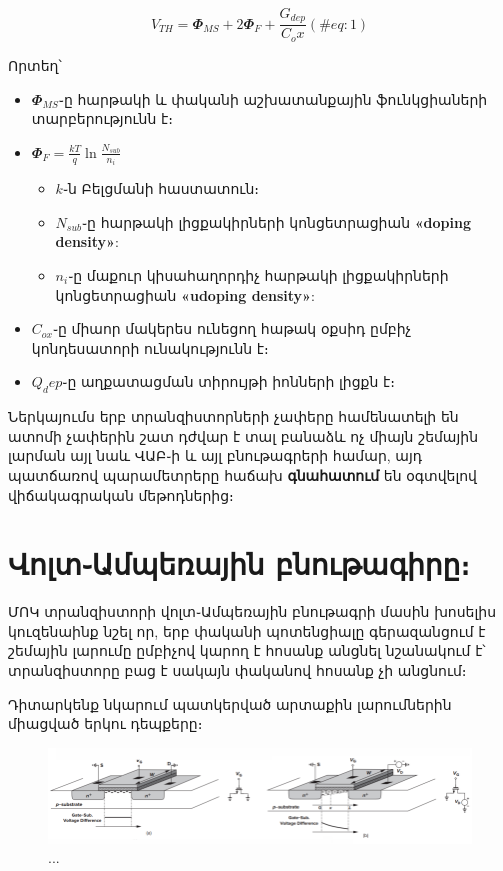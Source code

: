 \documentclass[
]{book}
\providecommand{\tightlist}{%
  \setlength{\itemsep}{0pt}\setlength{\parskip}{0pt}}
\begin{document}
\begin{equation} 
  V_{TH} = 𝜱_{MS} + 2 𝜱_F + \frac{G_{dep}}{C_ox}
  (\#eq:1)
\end{equation}

Որտեղ՝

\begin{itemize}
\tightlist
\item
  \(𝜱_{MS}\)֊ը հարթակի և փականի աշխատանքային ֆունկցիաների տարբերությունն
  է։
\item
  \(𝜱_F = \frac{kT}{q} \ln{\frac{N_{sub}}{n_i}}\)

  \begin{itemize}
  \tightlist
  \item
    \(k\)֊ն Բելցմանի հաստատուն։
  \item
    \(N_{sub}\)֊ը հարթակի լիցքակիրների կոնցետրացիան \textbf{«doping
    density»}:
  \item
    \(n_i\)֊ը մաքուր կիսահաղորդիչ հարթակի լիցքակիրների կոնցետրացիան
    \textbf{«udoping density»}:
  \end{itemize}
\item
  \(C_{ox}\)֊ը միաոր մակերես ունեցող հաթակ օքսիդ ըմբիչ կոնդեսատորի
  ունակությունն է։
\item
  \(Q_dep\)֊ը աղքատացման տիրույթի իոնների լիցքն է։
\end{itemize}

Ներկայումս երբ տրանզիստորների չափերը համենատելի են ատոմի չափերին շատ
դժվար է տալ բանաձև ոչ միայն շեմային լարման այլ նաև ՎԱԲ֊ի և այլ
բնութագրերի համար, այդ պատճառով պարամետրերը հաճախ \textbf{գնահատում} են
օգտվելով վիճակագրական մեթոդներից։

\hypertarget{ux57eux578ux56cux57fux561ux574ux57aux565ux57cux561ux575ux56bux576-ux562ux576ux578ux582ux569ux561ux563ux56bux580ux568}{%
\section{Վոլտ֊Ամպեռային
բնութագիրը։}\label{ux57eux578ux56cux57fux561ux574ux57aux565ux57cux561ux575ux56bux576-ux562ux576ux578ux582ux569ux561ux563ux56bux580ux568}}

ՄՈԿ տրանզիստորի վոլտ֊Ամպեռային բնութագրի մասին խոսելիս կուզենաինք նշել
որ, երբ փականի պոտենցիալը գերազանցում է շեմային լարումը ըմբիչով կարող է
հոսանք անցնել նշանակում է՝ տրանզիստորը բաց է սակայն փականով հոսանք չի
անցնում։

Դիտարկենք նկարում պատկերված արտաքին լարումներին միացված երկու դեպքերը։

\begin{figure}

{\centering \includegraphics[width=1\linewidth]{imige/va} 

}

\caption{...}\label{fig:unnamed-chunk-3}
\end{figure}
\end{document}

